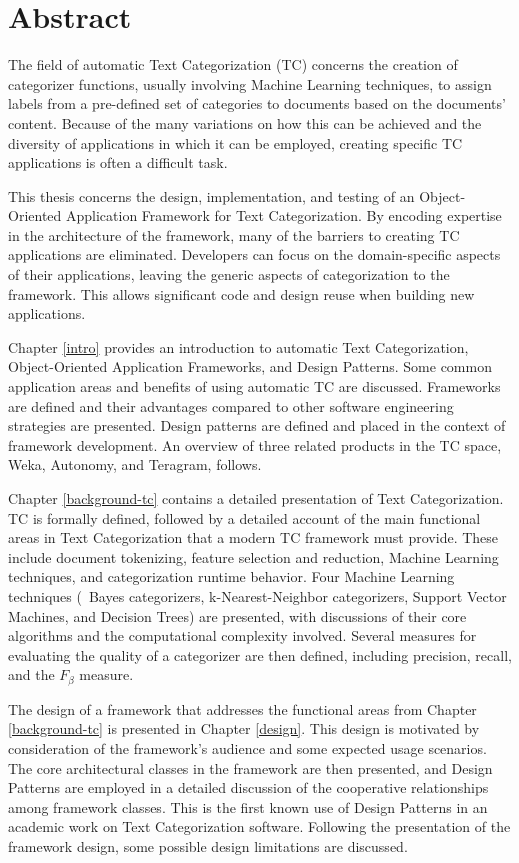 \chapter{Abstract}

The field of automatic Text Categorization (TC) concerns the creation
of categorizer functions, usually involving Machine Learning
techniques, to assign labels from a pre-defined set of categories to
documents based on the documents' content.  Because of the many
variations on how this can be achieved and the diversity of
applications in which it can be employed, creating specific TC
applications is often a difficult task.

This thesis concerns the design, implementation, and testing of an
Object-Oriented Application Framework for Text Categorization.  By
encoding expertise in the architecture of the framework, many of the
barriers to creating TC applications are eliminated.  Developers can
focus on the domain-specific aspects of their applications, leaving
the generic aspects of categorization to the framework.  This allows
significant code and design reuse when building new applications.

Chapter \ref{intro} provides an introduction to automatic Text
Categorization, Ob\-ject-Oriented Application Frameworks, and Design
Patterns.  Some common application areas and benefits of using
automatic TC are discussed.  Frameworks are defined and their
advantages compared to other software engineering strategies are
presented.  Design patterns are defined and placed in the context of
framework development.  An overview of three related products in the
TC space, Weka, Autonomy, and Teragram, follows.

Chapter \ref{background-tc} contains a detailed presentation of Text
Categorization.  TC is formally defined, followed by a detailed
account of the main functional areas in Text Categorization that a
modern TC framework must provide.  These include document tokenizing,
feature selection and reduction, Machine Learning techniques, and
categorization runtime behavior.  Four Machine Learning techniques
(\naive\ Bayes categorizers, k-Nearest-Neighbor categorizers, Support
Vector Machines, and Decision Trees) are presented, with discussions
of their core algorithms and the computational complexity involved.
Several measures for evaluating the quality of a categorizer are then
defined, including precision, recall, and the $F_\beta$ measure.

The design of a framework that addresses the functional areas from
Chapter \ref{background-tc} is presented in Chapter \ref{design}.
This design is motivated by consideration of the framework's audience
and some expected usage scenarios.  The core architectural classes in
the framework are then presented, and Design Patterns are employed in
a detailed discussion of the cooperative relationships among framework
classes.  This is the first known use of Design Patterns in an
academic work on Text Categorization software.  Following the
presentation of the framework design, some possible design limitations
are discussed.

